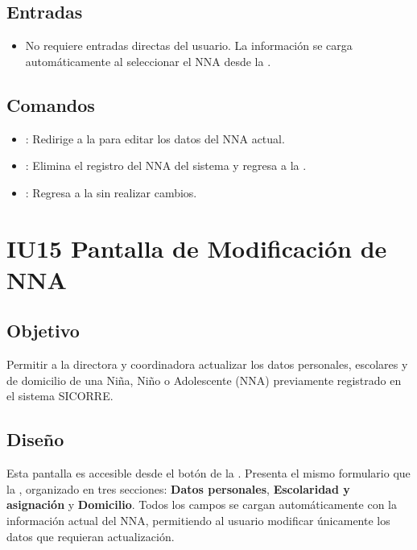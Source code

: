 \subsection{Entradas}
\begin{itemize}
	\item No requiere entradas directas del usuario. La información se carga 
	automáticamente al seleccionar el NNA desde la 
	.
\end{itemize}

\subsection{Comandos}
\begin{itemize}
	\item {}: Redirige a la 
	 para editar los datos 
	del NNA actual.
	\item {}: Elimina el registro del NNA del sistema y 
	regresa a la .
	\item {}: Regresa a la 
	 sin realizar cambios.
\end{itemize}


\section{IU15 Pantalla de Modificación de NNA}

\subsection{Objetivo}
Permitir a la directora y coordinadora actualizar los datos personales, escolares 
y de domicilio de una Niña, Niño o Adolescente (NNA) previamente registrado en 
el sistema SICORRE.

\subsection{Diseño}
Esta pantalla  es accesible desde 
el botón  de la . 
Presenta el mismo formulario que la , 
organizado en tres secciones: \textbf{Datos personales}, \textbf{Escolaridad y 
	asignación} y \textbf{Domicilio}. Todos los campos se cargan automáticamente con 
la información actual del NNA, permitiendo al usuario modificar únicamente los 
datos que requieran actualización.

